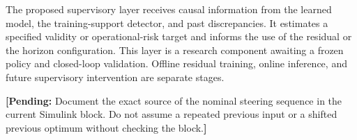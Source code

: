\documentclass[10pt,journal]{IEEEtran}
\newcommand{\pending}[1]{\par\smallskip\noindent\textbf{[Pending:} #1\textbf{]}\par\smallskip}
\begin{document}
The proposed supervisory layer receives causal information from the learned model, the training-support detector, and past discrepancies. It estimates a specified validity or operational-risk target and informs the use of the residual or the horizon configuration. This layer is a research component awaiting a frozen policy and closed-loop validation. Offline residual training, online inference, and future supervisory intervention are separate stages.
\pending{Document the exact source of the nominal steering sequence in the current Simulink block. Do not assume a repeated previous input or a shifted previous optimum without checking the block.}

%
%
\end{document}
